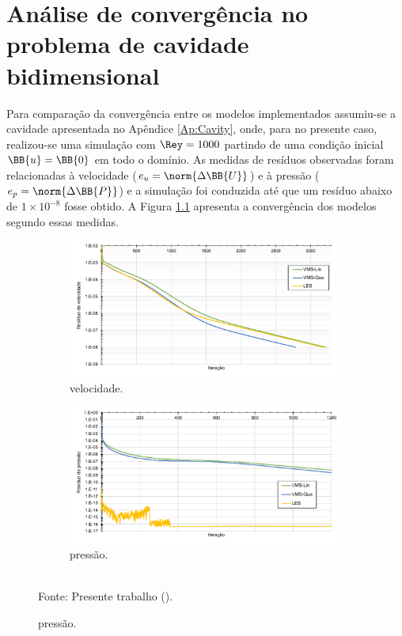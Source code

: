 \chapter[APÊNDICE \ref{Ap:Cavity2}]{Análise de convergência no problema de cavidade bidimensional}
\label{Ap:Cavity2}

Para comparação da convergência entre os modelos implementados assumiu-se a cavidade apresentada no Apêndice \ref{Ap:Cavity}, onde, para no presente caso, realizou-se uma simulação com $\Rey=1000$ partindo de uma condição inicial $\BB{u}=\BB{0}$ em todo o domínio. As medidas de resíduos observadas foram relacionadas à velocidade ($e_u=\norm{\Delta\BB{U}}$) e à pressão ($e_p=\norm{\Delta\BB{P}}$) e a simulação foi conduzida até que um resíduo abaixo de $1\times10^{-8}$ fosse obtido. A Figura \ref{fig:comp-res} apresenta a convergência dos modelos segundo essas medidas.

\begin{figure}[h!]
    \centering
    \caption{Comparação do resíduo da:}
    \begin{subfigure}{\textwidth}
        \includegraphics[width=\linewidth]{Figuras/Cavity/resvel.pdf}
        \caption{velocidade.}
    \end{subfigure}
    \begin{subfigure}{\textwidth}
        \includegraphics[width=\linewidth]{Figuras/Cavity/respre.pdf}
        \caption{pressão.}
    \end{subfigure}
    \\Fonte: Presente trabalho (\the\year).
    \label{fig:comp-res}
\end{figure}

